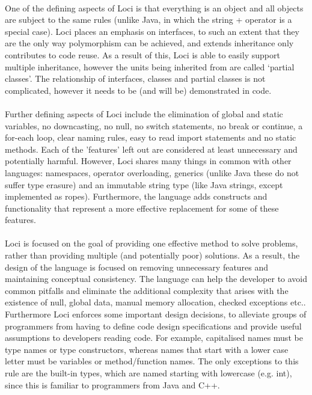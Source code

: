 \documentclass{article}
\begin{document}
\paragraph{}
One of the defining aspects of Loci is that everything is an object and all objects are subject to the same rules (unlike Java, in which the string + operator is a special case). Loci places an emphasis on interfaces, to such an extent that they are the only way polymorphism can be achieved, and extends inheritance only contributes to code reuse. As a result of this, Loci is able to easily support multiple inheritance, however the units being inherited from are called ‘partial classes’. The relationship of interfaces, classes and partial classes is not complicated, however it needs to be (and will be) demonstrated in code.

\paragraph{}
Further defining aspects of Loci include the elimination of global and static variables, no downcasting, no null, no switch statements, no break or continue, a for-each loop, clear naming rules, easy to read import statements and no static methods. Each of the 'features' left out are considered at least unnecessary and potentially harmful. However, Loci shares many things in common with other languages: namespaces, operator overloading, generics (unlike Java these do not suffer type erasure) and an immutable string type (like Java strings, except implemented as ropes). Furthermore, the language adds constructs and functionality that represent a more effective replacement for some of these features.

\paragraph{}
Loci is focused on the goal of providing one effective method to solve problems, rather than providing multiple (and potentially poor) solutions. As a result, the design of the language is focused on removing unnecessary features and maintaining conceptual consistency. The language can help the developer to avoid common pitfalls and eliminate the additional complexity that arises with the existence of null, global data, manual memory allocation, checked exceptions etc.. Furthermore Loci enforces some important design decisions, to alleviate groups of programmers from having to define code design specifications and provide useful assumptions to developers reading code. For example, capitalised names must be type names or type constructors, whereas names that start with a lower case letter must be variables or method/function names. The only exceptions to this rule are the built-in types, which are named starting with lowercase (e.g. int), since this is familiar to programmers from Java and C++.
\end{document}
